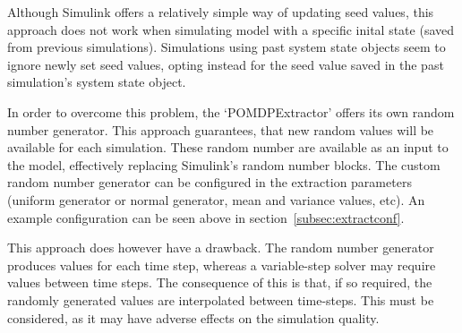 Although Simulink offers a relatively simple way of updating seed values, this approach does not work when simulating model with a specific inital state (saved from previous simulations). Simulations using past system state objects seem to ignore newly set seed values, opting instead for the seed value saved in the past simulation's system state object.

In order to overcome this problem, the `POMDPExtractor' offers its own random number generator. This approach guarantees, that new random values will be available for each simulation. These random number are available as an input to the model, effectively replacing Simulink's random number blocks. The custom random number generator can be configured in the extraction parameters (uniform generator or normal generator, mean and variance values, etc). An example configuration can be seen above in section~\ref{subsec:extractconf}.

This approach does however have a drawback. The random number generator produces values for each time step, whereas a variable-step solver may require values between time steps. The consequence of this is that, if so required, the randomly generated values are interpolated between time-steps. This must be considered, as it may have adverse effects on the simulation quality.


